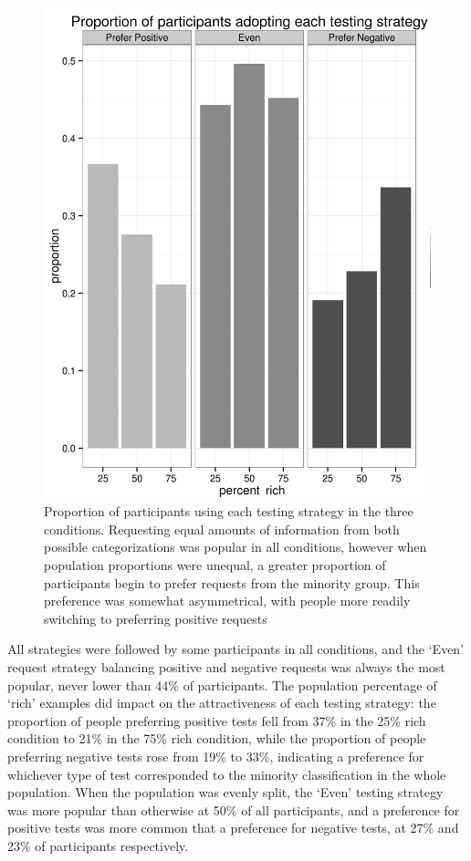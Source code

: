 \documentclass[10pt,letterpaper]{article}
\begin{document}
\begin{figure}[t]
\includegraphics[width=.5\textwidth]{sidebysidebar3_nolegendbw.png}
\caption{Proportion of participants using each testing strategy in the three conditions. Requesting equal amounts of information from both possible categorizations was popular in all conditions, however when population proportions were unequal, a greater proportion of participants begin to prefer requests from the minority group. This preference was somewhat asymmetrical, with people more readily switching to preferring positive requests}
\label{sidebysidebar3}
\end{figure}

All strategies were followed by some participants in all conditions, and the `Even' request strategy balancing positive and negative requests was always the most popular, never lower than 44\% of participants. The population percentage of `rich' examples did impact on the attractiveness of each testing strategy: the proportion of people preferring positive tests fell from 37\% in the 25\% rich condition to 21\% in the 75\% rich condition, while the proportion of people preferring negative tests rose from 19\% to 33\%, indicating a preference for whichever type of test corresponded to the minority classification in the whole population. When the population was evenly split, the `Even' testing strategy was more popular than otherwise at 50\% of all participants, and a preference for positive tests was more common that a preference for negative tests, at 27\% and 23\% of participants respectively.
\end{document}
